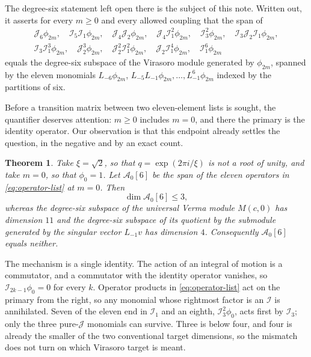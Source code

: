 \documentclass[11pt,reqno]{amsart}
\theoremstyle{plain}
\newtheorem{theorem}{Theorem}[section]
\theoremstyle{definition}
\theoremstyle{remark}
\numberwithin{equation}{section}
\newcommand{\Aop}{\mathcal A}
\newcommand{\Iop}{\mathcal I}
\newcommand{\Jop}{\mathcal J}
\begin{document}
The degree-six statement left open there is the subject of this note. Written
out, it asserts for every $m\ge0$ and every allowed coupling that the span
of
\begin{equation}
\begin{gathered}
\Jop_6\phi_{2m},\quad
\Iop_5\Iop_1\phi_{2m},\quad
\Jop_4\Jop_2\phi_{2m},\quad
\Jop_4\Iop_1^2\phi_{2m},\quad
\Iop_3^2\phi_{2m},\quad
\Iop_3\Jop_2\Iop_1\phi_{2m},\\
\Iop_3\Iop_1^3\phi_{2m},\quad
\Jop_2^3\phi_{2m},\quad
\Jop_2^2\Iop_1^2\phi_{2m},\quad
\Jop_2\Iop_1^4\phi_{2m},\quad
\Iop_1^6\phi_{2m}
\end{gathered}
\label{eq:operator-list}
\end{equation}
equals the degree-six subspace of the Virasoro module generated by
$\phi_{2m}$, spanned by the eleven monomials $L_{-6}\phi_{2m}$,
$L_{-5}L_{-1}\phi_{2m},\ldots,L_{-1}^6\phi_{2m}$ indexed by the partitions of
six.

Before a transition matrix between two eleven-element lists is sought, the
quantifier deserves attention: $m\ge0$ includes $m=0$, and there the primary
is the identity operator. Our observation is that this endpoint already
settles the question, in the negative and by an exact count.

\begin{theorem}
\label{thm:main-intro}
Take $\xi=\sqrt2$, so that $q=\exp(2\pi i/\xi)$ is not a root of unity, and
take $m=0$, so that $\phi_0=1$. Let $\Aop_0[6]$ be the span of the eleven
operators in \eqref{eq:operator-list} at $m=0$. Then
\[
  \dim\Aop_0[6]\le3,
\]
whereas the degree-six subspace of the universal Verma module $M(c,0)$ has
dimension $11$ and the degree-six subspace of its quotient by the submodule
generated by the singular vector $L_{-1}v$ has dimension $4$. Consequently
$\Aop_0[6]$ equals neither.
\end{theorem}

The mechanism is a single identity. The action of an integral of motion is a
commutator, and a commutator with the identity operator vanishes, so
$\Iop_{2k-1}\phi_0=0$ for every $k$. Operator products in
\eqref{eq:operator-list} act on the primary from the right, so any monomial
whose rightmost factor is an $\Iop$ is annihilated. Seven of the eleven end
in $\Iop_1$ and an eighth, $\Iop_3^2\phi_0$, acts first by $\Iop_3$; only the
three pure-$\Jop$ monomials can survive. Three is below four, and four is
already the smaller of the two conventional target dimensions, so the
mismatch does not turn on which Virasoro target is meant.
\end{document}
